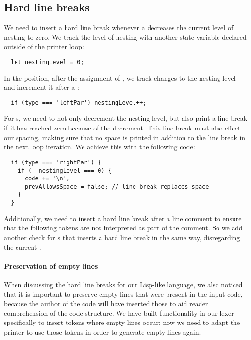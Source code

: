 \subsection{Hard line breaks}
We need to insert a hard line break
whenever a  decreases the
current level of nesting to zero.
We track the level of nesting with another
state variable declared outside of the printer loop:
\begin{verbatim}
  let nestingLevel = 0;
\end{verbatim}

In the  position,
after the assignment of ,
we track changes to the nesting level and
increment it after a :
\begin{verbatim}
  if (type === 'leftPar') nestingLevel++;
\end{verbatim}

For s, we need to
not only decrement the nesting level,
but also print a line break if
it has reached zero because of the decrement.
This line break must also effect our spacing,
making sure that no space is printed
in addition to the line break
in the next loop iteration.
We achieve this with the following code:
\begin{verbatim}
  if (type === 'rightPar') {
    if (--nestingLevel === 0) {
      code += '\n';
      prevAllowsSpace = false; // line break replaces space
    }
  }
\end{verbatim}

Additionally, we need to insert a hard line break
after a line comment to ensure that
the following tokens are not interpreted as part of the comment.
So we add another check for s that
inserts a hard line break in the same way,
disregarding the current .

\paragraph{Preservation of empty lines}
When discussing the hard line breaks for our Lisp-like language,
we also noticed that it is important
to preserve empty lines that were present in the input code,
because the author of the code will have inserted those
to aid reader comprehension of the code structure.
We have built functionality in our lexer specifically
to insert tokens where empty lines occur;
now we need to adapt the printer to use those tokens
in order to generate empty lines again.

